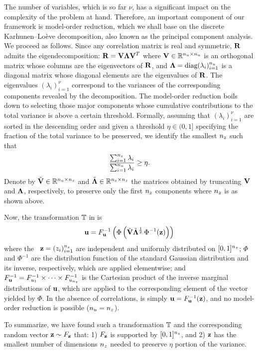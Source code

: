 The number of variables, which is so far $\nu$, has a significant impact on the
complexity of the problem at hand. Therefore, an important component of our
framework is model-order reduction, which we shall base on the discrete
Karhunen--Lo\`{e}ve decomposition, also known as the principal component
analysis. We proceed as follows. Since any correlation matrix is real and
symmetric, $\mathbf{R}$ admits the eigendecomposition: $\mathbf{R} = \mathbf{V}
\mathbf{\Lambda} \mathbf{V}^T$ where $\mathbf{V} \in \mathbb{R}^{{n_u} \times {n_u}}$ is an orthogonal
matrix whose columns are the eigenvectors of $\mathbf{R}$, and $\mathbf{\Lambda} =
\text{diag}(\lambda_i)_{i = 1}^{n_u}$ is a diagonal matrix whose diagonal elements are
the eigenvalues of $\mathbf{R}$. The eigenvalues $(\lambda_i)_{i = 1}^\nu$
correspond to the variances of the corresponding components revealed by the
decomposition. The model-order reduction boils down to selecting those major
components whose cumulative contributions to the total variance is above a
certain threshold. Formally, assuming that $(\lambda_i)_{i = 1}^\nu$ are sorted
in the descending order and given a threshold $\eta \in (0, 1]$ specifying the
fraction of the total variance to be preserved, we identify the smallest ${n_z}$
such that
\begin{equation} \elab{reduction}
  \frac{\sum_{i = 1}^\nz \lambda_i}{\sum_{i = 1}^\nu \lambda_i} \geq \eta.
\end{equation}
Denote by $\tilde{\mathbf{V}} \in \mathbb{R}^{{n_u} \times {n_z}}$ and $\tilde{\mathbf{\Lambda}}
\in\mathbb{R}^{{n_z} \times {n_z}}$ the matrices obtained by truncating $\mathbf{V}$ and
$\mathbf{\Lambda}$, respectively, to preserve only the first ${n_z}$ components where
${n_z}$ is as shown above.

Now, the transformation $\mathbb{T}$ in  is
\begin{equation} \elab{transformation-concrete}
  \vu = \distribution_\vu^{-1} \left( \Phi\left( \tilde{\m{V}} \tilde{\m{\Lambda}}^\frac{1}{2} \, \Phi^{-1}(\vz) \right) \right)
\end{equation}
where the \rvs\ $\mathbf{z} = (z_i)_{i = 1}^{n_z}$ are independent and uniformly
distributed on $[0, 1]^{n_z}$; $\Phi$ and $\Phi^{-1}$ are the distribution
function of the standard Gaussian distribution and its inverse, respectively,
which are applied elementwise; and $F_{\mathbf{u}}^{-1} =
F_{u_1}^{-1} \times \cdots \times F_{u_{n_z}}^{-1}$ is
the Cartesian product of the inverse marginal distributions of $\mathbf{u}$, which are
applied to the corresponding element of the vector yielded by $\Phi$. In the
absence of correlations,  is simply $\mathbf{u} =
F_{\mathbf{u}}^{-1}(\mathbf{z})$, and no model-order reduction is possible (${n_u} =
{n_z}$).

To summarize, we have found such a transformation $\mathbb{T}$ and the
corresponding random vector $\mathbf{z} \sim F_{\mathbf{z}}$ that: 1)
$F_{\mathbf{z}}$ is supported by $[0, 1]^{n_z}$, and 2) $\mathbf{z}$ has the smallest
number of dimensions ${n_z}$ needed to preserve $\eta$ portion of the variance.
